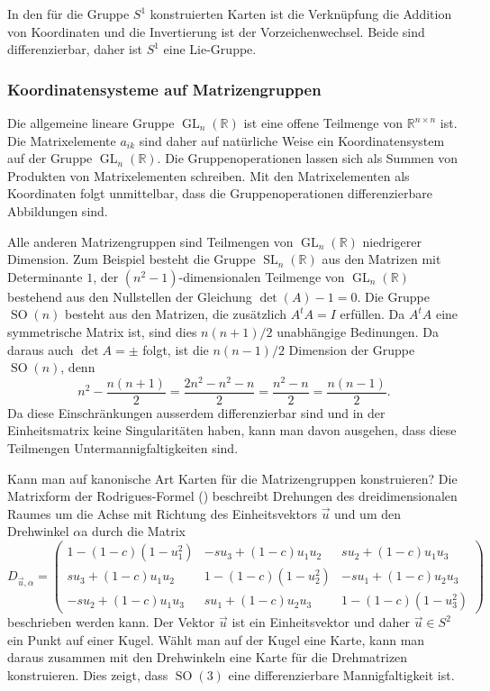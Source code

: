 In den für die Gruppe $S^1$ konstruierten Karten ist die Verknüpfung die
Addition von Koordinaten und die Invertierung ist der Vorzeichenwechsel.
Beide sind differenzierbar, daher ist $S^1$ eine Lie-Gruppe.

%
%
\subsubsection{Koordinatensysteme auf Matrizengruppen}
Die allgemeine lineare Gruppe $\operatorname{GL}_n(\mathbb{R})$
ist eine offene Teilmenge von $\mathbb{R}^{n\times n}$ ist.
Die Matrixelemente $a_{ik}$ sind daher auf natürliche Weise ein
Koordinatensystem auf der Gruppe $\operatorname{GL}_n(\mathbb{R})$.
Die Gruppenoperationen lassen sich als Summen von Produkten von
Matrixelementen schreiben.
Mit den Matrixelementen als Koordinaten folgt unmittelbar, dass
die Gruppenoperationen differenzierbare Abbildungen sind.

Alle anderen Matrizengruppen sind Teilmengen von
$\operatorname{GL}_n(\mathbb{R})$ niedrigerer Dimension.
Zum Beispiel besteht die Gruppe $\operatorname{SL}_n(\mathbb{R})$
aus den Matrizen mit Determinante $1$, der $(n^2-1)$-dimensionalen
Teilmenge von $\operatorname{GL}_n(\mathbb{R})$ bestehend aus
den Nullstellen der Gleichung $\det(A)-1=0$.
Die Gruppe $\operatorname{SO}(n)$ besteht aus den Matrizen, die
zusätzlich $A^tA=I$ erfüllen.
Da $A^tA$ eine symmetrische Matrix ist, sind dies
$n(n+1)/2$ unabhängige Bedinungen.
Da daraus auch $\det A=\pm$ folgt, ist die $n(n-1)/2$ Dimension der Gruppe
$\operatorname{SO}(n)$, denn
\[
n^2 - \frac{n(n+1)}2
=
\frac{2n^2-n^2-n}{2}
=
\frac{n^2-n}2
=
\frac{n(n-1)}2.
\]
Da diese Einschränkungen ausserdem differenzierbar sind und in der
Einheitsmatrix keine Singularitäten haben, kann man davon ausgehen,
dass diese Teilmengen Untermannigfaltigkeiten sind.

Kann man auf kanonische Art Karten für die Matrizengruppen
konstruieren?
Die Matrixform der Rodrigues-Formel (\cite[p.~438]{buch:linalg})
beschreibt Drehungen des dreidimensionalen Raumes um die Achse mit
Richtung des Einheitsvektors $\vec{u}$ und um den Drehwinkel $\alpha$a
durch die Matrix
\[
D_{\vec{u},\alpha}
=
\begin{pmatrix}
 1-(1-c)(1-u_1^2) & -su_3+(1-c)u_1u_2 &  su_2+(1-c)u_1u_3 \\
 su_3+(1-c)u_1u_2 &  1-(1-c)(1-u_2^2) & -su_1+(1-c)u_2u_3 \\
-su_2+(1-c)u_1u_3 &  su_1+(1-c)u_2u_3 &  1-(1-c)(1-u_3^2) 
\end{pmatrix}
\]
beschrieben werden kann.
Der Vektor $\vec{u}$ ist ein Einheitsvektor und daher $\vec{u}\in S^2$
ein Punkt auf einer Kugel.
Wählt man auf der Kugel eine Karte, kann man daraus zusammen mit den
Drehwinkeln eine Karte für die Drehmatrizen konstruieren.
Dies zeigt, dass $\operatorname{SO}(3)$ eine differenzierbare
Mannigfaltigkeit ist.

